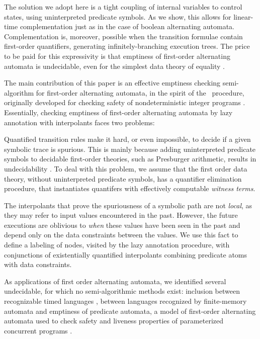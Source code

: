The solution we adopt here is a tight coupling of internal variables
to control states, using uninterpreted predicate symbols. As we show,
this allows for linear-time complementation just as in the case of
boolean alternating automata. Complementation is, moreover, possible
when the transition formulae contain first-order quantifiers,
generating infinitely-branching execution trees. The price to be paid
for this expressivity is that emptiness of first-order alternating
automata is undecidable, even for the simplest data theory of equality
\cite{Farzan15}.

The main contribution of this paper is an effective emptiness checking
semi-algorithm for first-order alternating automata, in the spirit of
the \impact~procedure, originally developed for checking safety of
nondeterministic integer programs \cite{McMillan06}. Essentially,
checking emptiness of first-order alternating automata by lazy
annotation with interpolants faces two problems: \begin{compactenum}
\item Quantified transition rules make it hard, or even impossible, to
  decide if a given symbolic trace is spurious. This is mainly because
  adding uninterpreted predicate symbols to decidable first-order
  theories, such as Presburger arithmetic, results in undecidability
  \cite{Halpern91}. To deal with this problem, we assume that the
  first order data theory, without uninterpreted predicate symbols,
  has a quantifier elimination procedure, that instantiates quantifers
  with effectively computable \emph{witness terms}.
%
\item The interpolants that prove the spuriousness of a symbolic path
  are not \emph{local}, as they may refer to input values encountered
  in the past. However, the future executions are oblivious to
  \emph{when} these values have been seen in the past and depend only
  on the data constraints between the values. We use this fact to
  define a labeling of nodes, visited by the lazy annotation
  procedure, with conjunctions of existentially quantified
  interpolants combining predicate atoms with data constraints.
\end{compactenum}

As applications of first order alternating automata, we identified
several undecidable, for which no semi-algorithmic methods exist:
inclusion between recognizable timed languages \cite{AlurDill94}, 
between languages recognized by finite-memory automata
\cite{KaminskiFrancez94} and emptiness of predicate automata,
a model of first-order alternating automata used to check safety and
liveness properties of parameterized concurrent programs
\cite{Farzan15,Farzan16}.

